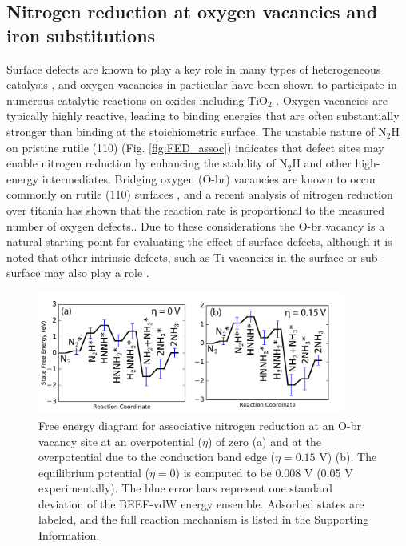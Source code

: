 \documentclass[journal=ascecg,manuscript=article,articletitle=true]{achemso}
\begin{document}
\subsection{Nitrogen reduction at oxygen vacancies and iron substitutions}

Surface defects are known to play a key role in many types of heterogeneous catalysis \cite{Yates_1991}, and oxygen vacancies in particular have been shown to participate in numerous catalytic reactions on oxides \cite{McFarland_2013} including TiO$_2$ \cite{Kim2016,Kim2014,Diebold2003,Pang2008,Pang_2013}. Oxygen vacancies are typically highly reactive, leading to binding energies that are often substantially stronger than binding at the stoichiometric surface. The unstable nature of N$_2$H on pristine rutile (110) (Fig. \ref{fig:FED_assoc}) indicates that defect sites may enable nitrogen reduction by enhancing the stability of N$_2$H and other high-energy intermediates. Bridging oxygen (O-br) vacancies are known to occur commonly on rutile (110) surfaces \cite{Diebold2003,Pang2008,Pang_2013}, and a recent analysis of nitrogen reduction over titania has shown that the reaction rate is proportional to the measured number of oxygen defects.\cite{Hirakawa_2017}. Due to these considerations the O-br vacancy is a natural starting point for evaluating the effect of surface defects, although it is noted that other intrinsic defects, such as Ti vacancies in the surface or sub-surface may also play a role \cite{Hobiger_1990}.

\begin{figure}
\includegraphics[width=0.9\textwidth]{figures/defect_associative_FED.pdf}
\caption{Free energy diagram for associative nitrogen reduction at an O-br vacancy site at an overpotential ($\eta$) of zero (a) and at the overpotential due to the conduction band edge ($\eta=0.15$ V) (b). The equilibrium potential ($\eta=0$) is computed to be 0.008 V (0.05 V experimentally). The blue error bars represent one standard deviation of the BEEF-vdW energy ensemble. Adsorbed states are labeled, and the full reaction mechanism is listed in the Supporting Information.}
\label{fig:FED_defect_assoc}
\end{figure}
\end{document}
